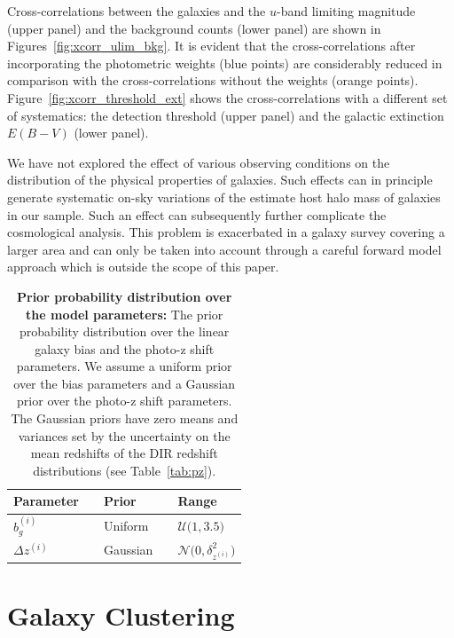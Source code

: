 \documentclass[fleqn,usenatbib,useAMS]{mnras}
\begin{document}
Cross-correlations between the galaxies and the $u$-band limiting magnitude (upper panel) and the background counts (lower panel) are shown in Figures~\ref{fig:xcorr_ulim_bkg}. It is evident that the cross-correlations after incorporating the photometric weights (blue points) are considerably reduced in comparison with the cross-correlations without the weights (orange points). Figure~\ref{fig:xcorr_threshold_ext} shows the cross-correlations with a different set of systematics: the detection threshold (upper panel) and the galactic extinction $E(B-V)$ (lower panel).

We have not explored the effect of various observing conditions on the distribution of the physical properties of galaxies. Such effects can in principle generate systematic on-sky variations of the estimate host halo mass of galaxies in our sample. Such an effect can subsequently further complicate the cosmological analysis. This problem is exacerbated in a galaxy survey covering a larger area and can only be taken into account through a careful forward model approach which is outside the scope of this paper.  

\begin{table}
\begin{center}
	\caption{{\bf Prior probability distribution over the model parameters:} 
    The prior probability distribution over the linear galaxy bias and the photo-z shift parameters. We assume a uniform prior over the bias parameters and a Gaussian prior over the photo-z shift parameters. The Gaussian priors have zero means and variances set by the uncertainty on the mean redshifts of the DIR redshift distributions (see Table~\ref{tab:pz}).}
	\label{tab:prior}
	\begin{tabular}{@{}lllll} 
	\\	\hline
		Parameter        & & Prior       & & Range \\
		\hline
		$b_{g}^{(i)}$    & & Uniform     & & $\mathcal{U}\Big(1,3.5\Big)$  \\
		$\Delta z^{(i)}$ & & Gaussian    & & $\mathcal{N}\Big(0, \delta^{2}_{z^{(i)}}\Big)$  \\
		\hline
	\end{tabular}
\end{center}
\end{table}



\section{Galaxy Clustering}\label{sec:clustering}
\end{document}
